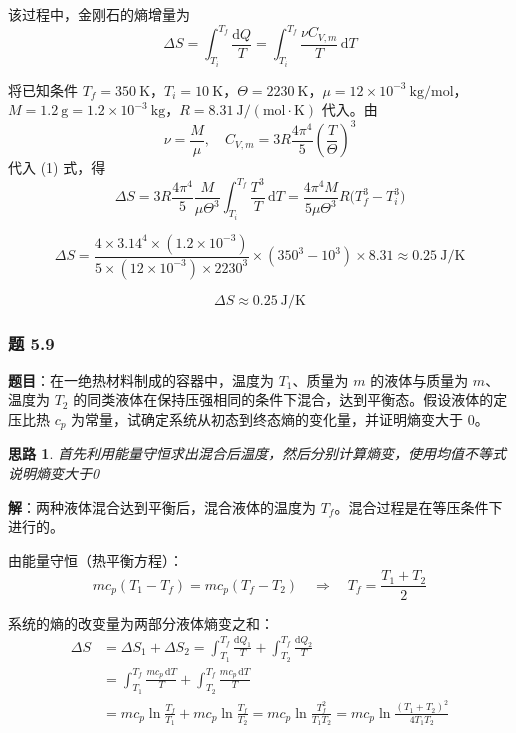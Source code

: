 \documentclass[UTF8]{ctexart}
\newtheorem{thoughts}{思路}[subsection]
\begin{document}
该过程中，金刚石的熵增量为
\[
\Delta S=\int_{T_i}^{T_f}\frac{\mathrm{d}Q}{T}
=\int_{T_i}^{T_f}\frac{\nu C_{V,m}}{T}\,\mathrm{d}T
\tag{1}
\]

将已知条件 $T_f=350\ \mathrm{K}$，$T_i=10\ \mathrm{K}$，$\Theta=2230\ \mathrm{K}$，$\mu=12\times 10^{-3}\ \mathrm{kg/mol}$，$M=1.2\ \mathrm{g}=1.2\times 10^{-3}\ \mathrm{kg}$，$R=8.31\ \mathrm{J/(mol\cdot K)}$ 代入。由
\[
\nu=\frac{M}{\mu},\quad C_{V,m}=3R\frac{4\pi^4}{5}\left(\frac{T}{\Theta}\right)^3
\]
代入 (1) 式，得
\[
\Delta S=3R\frac{4\pi^4}{5}\frac{M}{\mu\Theta^3}\int_{T_i}^{T_f}\frac{T^3}{T}\,\mathrm{d}T
=\frac{4\pi^4 M}{5\mu\Theta^3}R\bigl(T_f^3-T_i^3\bigr)
\tag{2}
\]

\[
\Delta S=\frac{4\times 3.14^4\times(1.2\times 10^{-3})}
{5\times(12\times 10^{-3})\times 2230^3}\times(350^3-10^3)\times 8.31
\approx 0.25\ \mathrm{J/K}
\]

\[
\boxed{\Delta S\approx 0.25\ \mathrm{J/K}}
\]

\subsubsection{题 5.9}

\textbf{题目}：在一绝热材料制成的容器中，温度为 $T_1$、质量为 $m$ 的液体与质量为 $m$、温度为 $T_2$ 的同类液体在保持压强相同的条件下混合，达到平衡态。假设液体的定压比热 $c_p$ 为常量，试确定系统从初态到终态熵的变化量，并证明熵变大于 $0$。

\begin{thoughts}
  首先利用能量守恒求出混合后温度，然后分别计算熵变，使用均值不等式说明熵变大于0
\end{thoughts}

\textbf{解}：两种液体混合达到平衡后，混合液体的温度为 $T_f$。混合过程是在等压条件下进行的。

由能量守恒（热平衡方程）：
\[
mc_p(T_1-T_f)=mc_p(T_f-T_2)\quad\Longrightarrow\quad
T_f=\frac{T_1+T_2}{2}
\]

系统的熵的改变量为两部分液体熵变之和：
\begin{align*}
\Delta S&=\Delta S_1+\Delta S_2
=\int_{T_1}^{T_f}\frac{\mathrm{d}Q_1}{T}+\int_{T_2}^{T_f}\frac{\mathrm{d}Q_2}{T}\\[4pt]
&=\int_{T_1}^{T_f}\frac{mc_p\,\mathrm{d}T}{T}
+\int_{T_2}^{T_f}\frac{mc_p\,\mathrm{d}T}{T}\\[4pt]
&=mc_p\ln\frac{T_f}{T_1}+mc_p\ln\frac{T_f}{T_2}
=mc_p\ln\frac{T_f^2}{T_1T_2}
=mc_p\ln\frac{(T_1+T_2)^2}{4T_1T_2}
\end{align*}
\end{document}
